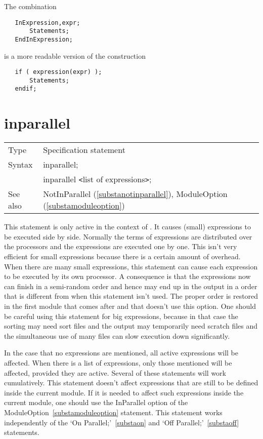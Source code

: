 \noindent The combination
\begin{verbatim}
   InExpression,expr;
       Statements;
   EndInExpression;
\end{verbatim}
is a more readable version of the construction
\begin{verbatim}
   if ( expression(expr) );
       Statements;
   endif;
\end{verbatim}
\vspace{10mm}


\section{inparallel}
\label{substainparallel}

\noindent \begin{tabular}{ll}
Type & Specification statement\\
Syntax & inparallel; \\
       & inparallel {\tt<}list of expressions{\tt>};
\\ See also & NotInParallel (\ref{substanotinparallel}), 
     ModuleOption (\ref{substamoduleoption})
\end{tabular} \vspace{4mm}

\noindent This statement is only active in the context of 
\TFORM{}. It causes 
(small) expressions to be executed side by side. Normally the terms of 
expressions are distributed over the processors and the expressions are 
executed one by one. This isn't very efficient for small expressions 
because there is a certain amount of overhead. When there are many small 
expressions, this statement can cause each expression to be executed by its 
own processor. A consequence is that the expressions now can finish in a 
semi-random order and hence may end up in the output in a order that is 
different from when this statement isn't used. The proper order is restored 
in the first module that comes after and that doesn't use this option. One 
should be careful using this statement for big expressions, because in that 
case the sorting may need sort files and the output may temporarily need 
scratch files and the simultaneous use of many files can slow execution 
down significantly.

\noindent In the case that no expressions are mentioned, all active 
expressions will be affected. When there is a list of expressions, only 
those mentioned will be affected, provided they are active. Several of 
these statements will work cumulatively. This statement doesn't affect 
expressions that are still to be defined inside the current module. If it 
is needed to affect such expressions inside the current module, one should 
use the InParallel option of the 
ModuleOption~\ref{substamoduleoption} 
statement. This statement works independently of the `On 
Parallel;'~\ref{substaon} and `Off Parallel;'~\ref{substaoff} statements.
\vspace{10mm}

